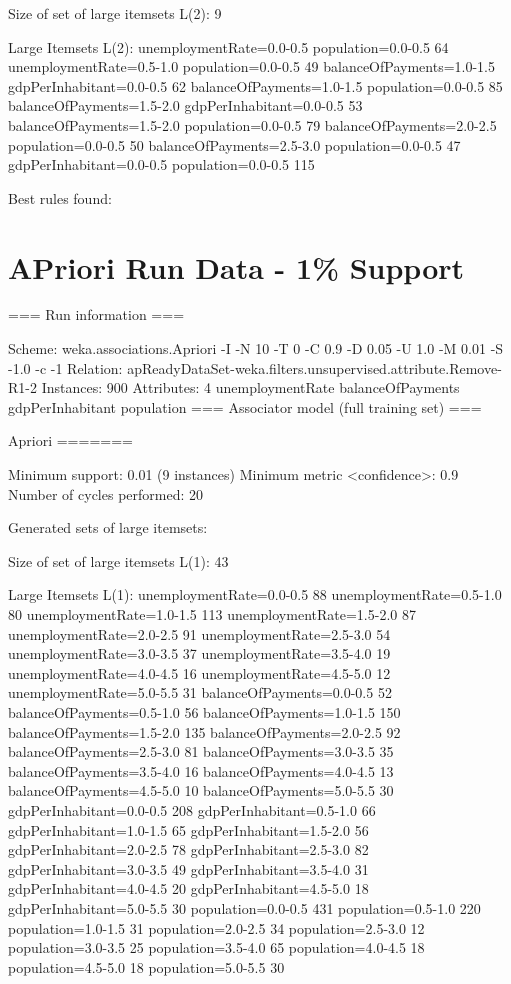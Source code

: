 Size of set of large itemsets L(2): 9

Large Itemsets L(2):
unemploymentRate=0.0-0.5 population=0.0-0.5 64
unemploymentRate=0.5-1.0 population=0.0-0.5 49
balanceOfPayments=1.0-1.5 gdpPerInhabitant=0.0-0.5 62
balanceOfPayments=1.0-1.5 population=0.0-0.5 85
balanceOfPayments=1.5-2.0 gdpPerInhabitant=0.0-0.5 53
balanceOfPayments=1.5-2.0 population=0.0-0.5 79
balanceOfPayments=2.0-2.5 population=0.0-0.5 50
balanceOfPayments=2.5-3.0 population=0.0-0.5 47
gdpPerInhabitant=0.0-0.5 population=0.0-0.5 115

Best rules found:

\section{APriori Run Data - 1\% Support}
=== Run information ===

Scheme:       weka.associations.Apriori -I -N 10 -T 0 -C 0.9 -D 0.05 -U 1.0 -M 0.01 -S -1.0 -c -1
Relation:     apReadyDataSet-weka.filters.unsupervised.attribute.Remove-R1-2
Instances:    900
Attributes:   4
              unemploymentRate
              balanceOfPayments
              gdpPerInhabitant
              population
=== Associator model (full training set) ===


Apriori
=======

Minimum support: 0.01 (9 instances)
Minimum metric <confidence>: 0.9
Number of cycles performed: 20

Generated sets of large itemsets:

Size of set of large itemsets L(1): 43

Large Itemsets L(1):
unemploymentRate=0.0-0.5 88
unemploymentRate=0.5-1.0 80
unemploymentRate=1.0-1.5 113
unemploymentRate=1.5-2.0 87
unemploymentRate=2.0-2.5 91
unemploymentRate=2.5-3.0 54
unemploymentRate=3.0-3.5 37
unemploymentRate=3.5-4.0 19
unemploymentRate=4.0-4.5 16
unemploymentRate=4.5-5.0 12
unemploymentRate=5.0-5.5 31
balanceOfPayments=0.0-0.5 52
balanceOfPayments=0.5-1.0 56
balanceOfPayments=1.0-1.5 150
balanceOfPayments=1.5-2.0 135
balanceOfPayments=2.0-2.5 92
balanceOfPayments=2.5-3.0 81
balanceOfPayments=3.0-3.5 35
balanceOfPayments=3.5-4.0 16
balanceOfPayments=4.0-4.5 13
balanceOfPayments=4.5-5.0 10
balanceOfPayments=5.0-5.5 30
gdpPerInhabitant=0.0-0.5 208
gdpPerInhabitant=0.5-1.0 66
gdpPerInhabitant=1.0-1.5 65
gdpPerInhabitant=1.5-2.0 56
gdpPerInhabitant=2.0-2.5 78
gdpPerInhabitant=2.5-3.0 82
gdpPerInhabitant=3.0-3.5 49
gdpPerInhabitant=3.5-4.0 31
gdpPerInhabitant=4.0-4.5 20
gdpPerInhabitant=4.5-5.0 18
gdpPerInhabitant=5.0-5.5 30
population=0.0-0.5 431
population=0.5-1.0 220
population=1.0-1.5 31
population=2.0-2.5 34
population=2.5-3.0 12
population=3.0-3.5 25
population=3.5-4.0 65
population=4.0-4.5 18
population=4.5-5.0 18
population=5.0-5.5 30

